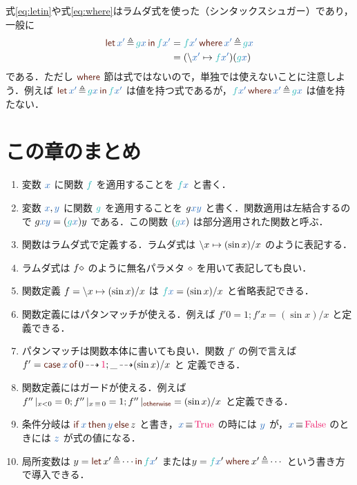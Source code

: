 \documentclass[a5paper,twoside,fleqn,draft]{jsbook}
\begin{document}
式\eqref{eq:letin}や式\eqref{eq:where}はラムダ式を使った（シンタックスシュガー）であり，一般に
\begin{align}
  \hLetSyntax{\hVar{x'}\hLetEq\hFunc{g}\hVar{x}}{\hFunc{f}\hVar{x'}}
  &=\hWhereSyntax{\hFunc{f}\hVar{x'}}{\hVar{x'}\hLetEq\hFunc{g}\hVar{x}}\\
  &=(\hLambdaSyntax{\hVar{x'}}{\hFunc{f}\hVar{x'}})(\hFunc{g}\hVar{x})
\end{align}
である．ただし $\hWhere$ 節は式ではないので，単独では使えないことに注意しよう．例えば $\hLetSyntax{\hVar{x'}\hLetEq\hFunc{g}\hVar{x}}{\hFunc{f}\hVar{x'}}$ は値を持つ式であるが，$\hWhereSyntax{\hFunc{f}\hVar{x'}}{\hVar{x'}\hLetEq\hFunc{g}\hVar{x}}$ は値を持たない．

\section{この章のまとめ}

\begin{enumerate}
\item 変数 $\hVar{x}$ に関数 $\hFunc{f}$ を適用することを $\hFunc{f}\hVar{x}$ と書く．\item 変数 $\hVar{x},\hVar{y}$ に関数 $\hFunc{g}$ を適用することを $g\hVar{x}\hVar{y}$ と書く．関数適用は左結合するので $g\hVar{x}\hVar{y}=(\hFunc{g}\hVar{x})y$ である．この関数 $(\hFunc{g}\hVar{x})$ は部分適用された関数と呼ぶ．
\item 関数はラムダ式で定義する．ラムダ式は $\backslash x\mapsto(\sin x)/x$ のように表記する．\item ラムダ式は $f\diamond$ のように無名パラメタ $\diamond$ を用いて表記しても良い．\item 関数定義 $f=\backslash x\mapsto(\sin x)/x$ は $\hFunc{f}\hVar{x}=(\sin x)/x$ と省略表記できる．
\item 関数定義にはパタンマッチが使える．例えば $f'0=1;f'x=(\sin x)/x$ と定義できる．\item パタンマッチは関数本体に書いても良い．関数 $f'$ の例で言えば $f'=\hCaseSyntax{\hVar{x}}0\hIfSo\hConstant{1};\_\hIfSo(\sin x)/x$ と 定義できる．\item 関数定義にはガードが使える．例えば $f''\hGuard{x<0}=0;f''\hGuard{x\hIfEq0}=1;f''\hGuard{\hOtherwise}=(\sin x)/x$ と定義できる．\item 条件分岐は $\mIfThenElseEXP{\hVar{x}}{\hVar{y}}{z}$ と書き，$\hVar{x}\hIfEq\hTrue$ の時には $\hVar{y}$ が，$\hVar{x}\hIfEq\hFalse$ のときには $\hVar{z}$ が式の値になる．\item 局所変数は $y=\mLetInEXP{x'}{\dotsb}{\hFunc{f}\hVar{x}'}$ または$y=\hFunc{f}\hVar{x}'\mWhereIsEXP{x'}{\dotsb}$ という書き方で導入できる．
\end{enumerate}
\end{document}
